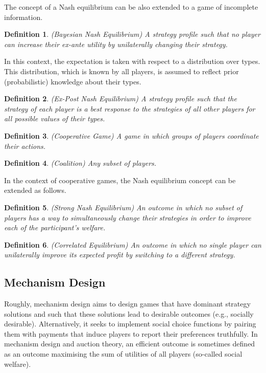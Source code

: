 \documentclass{article}
\newtheorem{definition}{Definition}
\begin{document}
The concept of a Nash equilibrium can be also extended to a game of incomplete information.

\begin{definition}
(Bayesian Nash Equilibrium) A strategy profile such that no player can increase their ex-ante utility by unilaterally changing their strategy.
\end{definition}

In this context, the expectation is taken with respect to a distribution over types. This distribution, which is known by all players, is assumed to reflect prior (probabilistic) knowledge about their types.

\begin{definition}
(Ex-Post Nash Equilibrium) A strategy profile such that the strategy of each player is a best response to the strategies of all other players for all possible values of their types.
\end{definition}

\begin{definition}
(Cooperative Game) A game in which groups of players coordinate their actions.
\end{definition}

\begin{definition}
(Coalition) Any subset of players.
\end{definition}

In the context of cooperative games, the Nash equilibrium concept can be extended as follows.

\begin{definition}
(Strong Nash Equilibrium) An outcome in which no subset of players has a way to simultaneously change their strategies in order to improve each of the participant's welfare.
\end{definition}

\begin{definition}
(Correlated Equilibrium) An outcome in which no single player can unilaterally improve its expected profit by switching to a different strategy.
\end{definition}

\subsection{Mechanism Design}

Roughly, mechanism design aims to design games that have dominant strategy solutions and such that these solutions lead to desirable outcomes (e.g., socially desirable). Alternatively, it seeks to implement social choice functions by pairing them with payments that induce players to report their preferences truthfully. In mechanism design and auction theory, an efficient outcome is sometimes defined as an outcome maximising the sum of utilities of all players (so-called social welfare).
\end{document}
